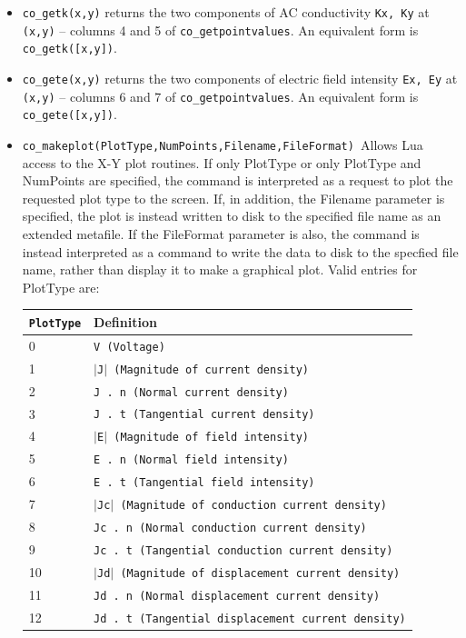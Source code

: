 \begin{itemize}
\item{\tt co\_getk(x,y)} returns the two components of AC conductivity {\tt Kx, Ky} at {\tt (x,y)} -- columns 4 and 5 of {\tt co\_getpointvalues}. An equivalent form is {\tt co\_getk([x,y])}.

\item{\tt co\_gete(x,y)} returns the two components of electric field intensity {\tt Ex, Ey} at {\tt (x,y)} -- columns 6 and 7 of {\tt co\_getpointvalues}. An equivalent form is {\tt co\_gete([x,y])}.

\item \texttt{co\_makeplot(PlotType,NumPoints,Filename,FileFormat) }Allows Lua access
to the X-Y plot routines. If only PlotType or only PlotType and NumPoints
are specified, the command is interpreted as a request to plot the requested
plot type to the screen. If, in addition, the Filename parameter is
specified, the plot is instead written to disk to the specified file name as
an extended metafile. If the FileFormat parameter is also, the command is
instead interpreted as a command to write the data to disk to the specfied
file name, rather than display it to make a graphical plot. Valid entries
for PlotType are:

\begin{tabular}{ll}
\texttt{PlotType} &  Definition \\ \hline
 0 & \texttt{V (Voltage)} \\
 1 & \texttt{$\vert$J$\vert$ (Magnitude of current density)} \\
 2 & \texttt{J . n (Normal current density)} \\
 3 & \texttt{J . t (Tangential current density)} \\
 4 & \texttt{$\vert$E$\vert$ (Magnitude of field intensity)} \\
 5 & \texttt{E . n (Normal field intensity)} \\
 6 & \texttt{E . t (Tangential field intensity)} \\
 7 & \texttt{$\vert$Jc$\vert$ (Magnitude of conduction current density)} \\
 8 & \texttt{Jc . n (Normal conduction current density)} \\
 9 & \texttt{Jc . t (Tangential conduction current density)} \\
 10 & \texttt{$\vert$Jd$\vert$ (Magnitude of displacement current density)} \\
 11 & \texttt{Jd . n (Normal displacement current density)} \\
 12 & \texttt{Jd . t (Tangential displacement current density)} \\
\end{tabular}


\end{itemize}
